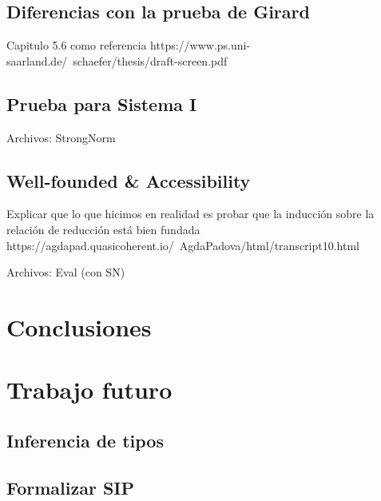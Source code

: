 \documentclass[]{report}
\begin{document}
	\subsection{Diferencias con la prueba de Girard}
	Capitulo 5.6 como referencia
	https://www.ps.uni-saarland.de/~schaefer/thesis/draft-screen.pdf

	\subsection{Prueba para Sistema I}
	
	Archivos: StrongNorm
	
	\subsection{Well-founded \& Accessibility}
	Explicar que lo que hicimos en realidad es probar que la inducción sobre la relación de reducción está bien fundada
	https://agdapad.quasicoherent.io/~AgdaPadova/html/transcript10.html
	
	Archivos: Eval (con SN)
	
	\section{Conclusiones}
	
	
	\section{Trabajo futuro}
	\subsection{Inferencia de tipos}
	\subsection{Formalizar SIP}
	
	
	\printbibliography
	
\end{document}
